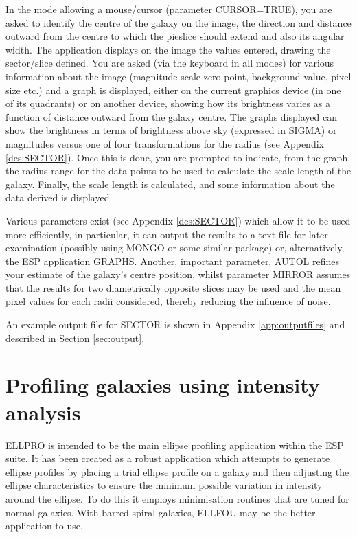 \documentclass[twoside,11pt]{article}
\newcommand{\xlabel}[1]{}
\begin{document}
In the mode allowing a mouse/cursor (parameter CURSOR=TRUE), you are
asked to identify the centre of the galaxy on the image, the direction 
and distance outward from the centre to which the pieslice should 
extend and also its angular width. The application displays on the image
the values entered, drawing the sector/slice defined. You are asked 
(via the keyboard in all modes) for various information about the image 
(magnitude scale zero point, background value, pixel size etc.) and a graph 
is displayed, either on the current graphics device (in one of its quadrants) 
or on another device, showing how its brightness varies as a 
function of distance outward from the galaxy centre. The graphs displayed 
can show the brightness in terms of brightness above sky (expressed in SIGMA)
or magnitudes versus one of four transformations for the radius 
(see Appendix \ref{des:SECTOR}). Once this is done, you are prompted to 
indicate, from the graph, 
the radius range for the data points to be used to calculate the scale 
length of the galaxy. Finally, the scale length is calculated,
and some information about the data derived is displayed. 

Various parameters exist (see Appendix \ref{des:SECTOR}) which allow it 
to be used more
efficiently, in particular, it can output the results to a text 
file for later examination (possibly using MONGO or some similar package) or,
alternatively, the ESP application GRAPHS. Another, important parameter, AUTOL 
refines your estimate of the galaxy's centre position, whilst parameter 
MIRROR assumes that the results for two diametrically opposite slices may
be used and the mean pixel values for each radii considered, thereby reducing 
the influence of noise. 

An example output file for SECTOR is shown in Appendix \ref{app:outputfiles}
and described in Section \ref{sec:output}.


\section{Profiling galaxies using intensity analysis}
\xlabel{ELLPRO}
\label{sec:profi}

ELLPRO is intended to be the main ellipse profiling application within the 
ESP suite. It has been created as a robust application which attempts to 
generate ellipse profiles by placing a trial ellipse profile on a 
galaxy and then adjusting the ellipse characteristics to ensure the 
minimum possible variation in intensity around the ellipse.
To do this it employs minimisation routines that are  
tuned for normal galaxies. With barred spiral galaxies, ELLFOU may be the
better application to use. 
\end{document}
